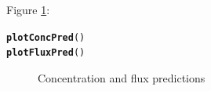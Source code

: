 \documentclass[a4paper,11pt]{article}\usepackage[]{graphicx}\usepackage[]{color}
\makeatletter
\newcommand{\hlstd}[1]{\textcolor[rgb]{0.345,0.345,0.345}{#1}}%
\newcommand{\hlkwd}[1]{\textcolor[rgb]{0.737,0.353,0.396}{\textbf{#1}}}%
\newenvironment{kframe}{%
 \def\at@end@of@kframe{}%
 \ifinner\ifhmode%
  \def\at@end@of@kframe{\end{minipage}}%
  \begin{minipage}{\columnwidth}%
 \fi\fi%
 \def\FrameCommand##1{\hskip\@totalleftmargin \hskip-\fboxsep
 \colorbox{shadecolor}{##1}\hskip-\fboxsep
     \hskip-\linewidth \hskip-\@totalleftmargin \hskip\columnwidth}%
 \MakeFramed {\advance\hsize-\width
   \@totalleftmargin\z@ \linewidth\hsize
   \@setminipage}}%
 {\par\unskip\endMakeFramed%
 \at@end@of@kframe}
\newenvironment{knitrout}{}{} %
\makeatother
\begin{document}
Figure \ref{fig:plotFluxPred}:
\begin{knitrout}
\color{fgcolor}\begin{kframe}
\begin{alltt}
\hlkwd{plotConcPred}\hlstd{()}
\hlkwd{plotFluxPred}\hlstd{()}
\end{alltt}
\end{kframe}\begin{figure}[]
\caption[Concentration and flux predictions]{Concentration and flux predictions\label{fig:plotFluxPred}}
\end{figure}


\end{knitrout}
\end{document}
